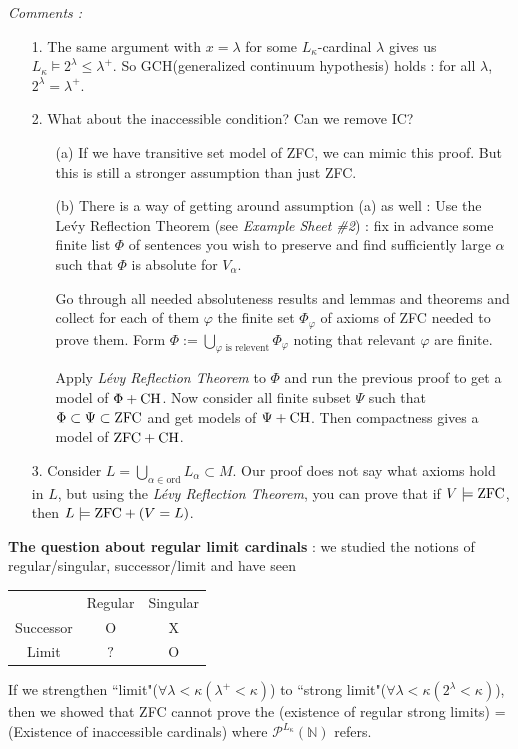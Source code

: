 \documentclass[12pt,a4paper]{article}
\begin{document}
\emph{Comments :}
\begin{itemize}
\item[1.] The same argument with $x= \lambda$ for some $L_{\kappa}$-cardinal $\lambda$ gives us $L_{\kappa} \models 2^{\lambda} \leq \lambda^+$. So GCH(generalized continuum hypothesis) holds : for all $\lambda$, $2^{\lambda} = \lambda^+$.
\item[2.] What about the inaccessible condition? Can we remove IC?
\begin{itemize}
\item[(a)] If we have transitive set model of ZFC, we can mimic this proof. But this is still a stronger assumption than just ZFC.
\item[(b)] There is a way of getting around assumption (a) as well : Use the Le\'vy Reflection Theorem (see \emph{Example Sheet \#2}) : fix in advance some finite list $\Phi$ of sentences you wish to preserve and find sufficiently large $\alpha$ such that $\Phi$ is absolute for $V_{\alpha}$. 

\quad Go through all needed absoluteness results and lemmas and theorems and collect for each of them $\varphi$ the finite set $\Phi_{\varphi}$ of axioms of ZFC needed to prove them. Form $\Phi := \bigcup_{\varphi \text{ is relevent}} \Phi_{\varphi}$ noting that relevant $\varphi$ are finite.

\quad Apply \emph{L\'evy Reflection Theorem} to $\Phi$ and run the previous proof to get a model of $\Phi + \text{CH}$. Now consider all finite subset $\Psi$ such that $\Phi \subset \Psi \subset \text{ZFC}$ and get models of $\Psi + \text{CH}$. Then compactness gives a model of $\text{ZFC} + \text{CH}$.
\end{itemize}
\item[3.] Consider $L = \bigcup_{\alpha \in \text{ord}} L_{\alpha} \subset M$. Our proof does not say what axioms hold in $L$, but using the \emph{L\'evy Reflection Theorem}, you can prove that if $V\models \text{ZFC}$, then $L \models \text{ZFC} + (V=L)$.
\end{itemize}
\s

\textbf{The question about regular limit cardinals} : we studied the notions of regular/singular, successor/limit and have seen
\begin{center}
\begin{tabular}{ c c c }
{} & Regular & Singular \\
Successor & O & X \\
Limit & $?$ & O
\end{tabular}
\end{center}
If we strengthen ``limit"($\forall \lambda< \kappa(\lambda^+< \kappa)$) to ``strong limit"($\forall \lambda< \kappa (2^{\lambda}  < \kappa)$), then we showed that ZFC cannot prove the (existence of regular strong limits) = (Existence of inaccessible cardinals) where $\mathscr{P}^{L_{\kappa}}(\mathbb{N})$ refers. 
\s
\end{document}
